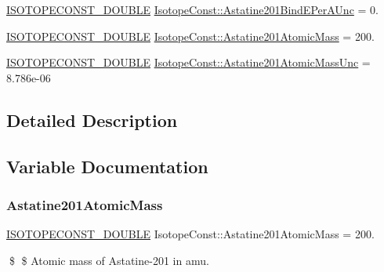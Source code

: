 \begin{DoxyCompactItemize}
\mbox{\hyperlink{group___isotope_const-_macros_ga8f45a7272ce02c0b4c65c44636ed719a}{I\+S\+O\+T\+O\+P\+E\+C\+O\+N\+S\+T\+\_\+\+D\+O\+U\+B\+LE}} \mbox{\hyperlink{group___isotope_const-_astatine-_at201_gadfc259f777dbb27a84094ed40979b23e}{Isotope\+Const\+::\+Astatine201\+Bind\+E\+Per\+A\+Unc}} = 0.
\item 
\mbox{\hyperlink{group___isotope_const-_macros_ga8f45a7272ce02c0b4c65c44636ed719a}{I\+S\+O\+T\+O\+P\+E\+C\+O\+N\+S\+T\+\_\+\+D\+O\+U\+B\+LE}} \mbox{\hyperlink{group___isotope_const-_astatine-_at201_gab3d708ac8207c7b22dcd5d3be059db77}{Isotope\+Const\+::\+Astatine201\+Atomic\+Mass}} = 200.
\item 
\mbox{\hyperlink{group___isotope_const-_macros_ga8f45a7272ce02c0b4c65c44636ed719a}{I\+S\+O\+T\+O\+P\+E\+C\+O\+N\+S\+T\+\_\+\+D\+O\+U\+B\+LE}} \mbox{\hyperlink{group___isotope_const-_astatine-_at201_ga9f6b30b792799e5e9987087e9bad70c7}{Isotope\+Const\+::\+Astatine201\+Atomic\+Mass\+Unc}} = 8.\+786e-\/06
\end{DoxyCompactItemize}


\subsection{Detailed Description}


\subsection{Variable Documentation}
\mbox{\label{group___isotope_const-_astatine-_at201_gab3d708ac8207c7b22dcd5d3be059db77}} 
\subsubsection{\texorpdfstring{Astatine201\+Atomic\+Mass}{Astatine201AtomicMass}}
{\footnotesize\ttfamily \mbox{\hyperlink{group___isotope_const-_macros_ga8f45a7272ce02c0b4c65c44636ed719a}{I\+S\+O\+T\+O\+P\+E\+C\+O\+N\+S\+T\+\_\+\+D\+O\+U\+B\+LE}} Isotope\+Const\+::\+Astatine201\+Atomic\+Mass = 200.}

\$ \$ Atomic mass of Astatine-\/201 in amu. \mbox{\label{group___isotope_const-_astatine-_at201_ga9f6b30b792799e5e9987087e9bad70c7}} 
